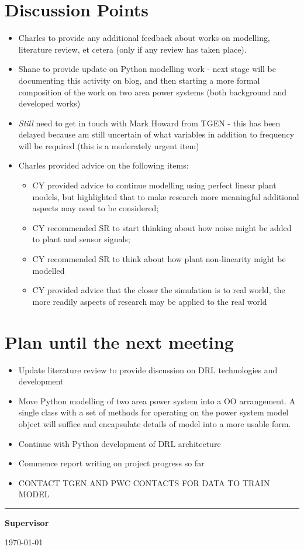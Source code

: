 \documentclass[12pt]{article}
\begin{document}
	\section{Discussion Points}
	\begin{itemize}
		\item Charles to provide any additional feedback about works on modelling, literature review, et cetera (only if any review has taken place).
		\item Shane to provide update on Python modelling work - next stage will be documenting this activity on blog, and then starting a more formal composition of the work on two area power systems (both background and developed works)
		\item \textit{Still} need to get in touch with Mark Howard from TGEN - this has been delayed because am still uncertain of what variables in addition to frequency will be required (this is a moderately urgent item)
		\item Charles provided advice on the following items:
		\begin{itemize}
			\item CY provided advice to continue modelling using perfect linear plant models, but highlighted that to make research more meaningful additional aspects may need to be considered;
			\item CY recommended SR to start thinking about how noise might be added to plant and sensor signals;
			\item CY recommended SR to think about how plant non-linearity might be modelled
			\item CY provided advice that the closer the simulation is to real world, the more readily aspects of research may be applied to the real world
		\end{itemize}
	\end{itemize}

	\section{Plan until the next meeting}
	\begin{itemize}
		\item Update literature review to provide discussion on DRL technologies and development
		\item Move Python modelling of two area power system into a OO arrangement. A single class with a set of methods for operating on the power system model object will suffice and encapsulate details of model into a more usable form. 
		\item Continue with Python development of DRL architecture
		\item Commence report writing on project progress so far
		\item CONTACT TGEN AND PWC CONTACTS FOR DATA TO TRAIN MODEL
	\end{itemize}
	
	\par
	\vspace{\fill}%
	\noindent\rule{0.4\linewidth}{0.5pt}%
	\vspace{1em}%
	\par
	\noindent\textbf{Supervisor}\vspace{1em}%
	\par
	\noindent\today
\end{document}
